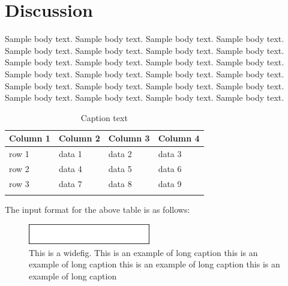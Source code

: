 \documentclass[default,iicol,lineno]{sn-jnl}%
\begin{document}
\section{Discussion}\label{sec4_results}

Sample body text. Sample body text. Sample body text. Sample body text. Sample body text. Sample body text. Sample body text. Sample body text. Sample body text. Sample body text. Sample body text. Sample body text. Sample body text. Sample body text. Sample body text. Sample body text. Sample body text. Sample body text. Sample body text. Sample body text. Sample body text. Sample body text. Sample body text. Sample body text.

\begin{table}[h]
\caption{Caption text}\label{tab1}%
\begin{tabular}{@{}llll@{}}
\toprule
Column 1 & Column 2  & Column 3 & Column 4\\
\midrule
row 1    & data 1   & data 2  & data 3  \\
row 2    & data 4   & data 5\footnotemark[1]  & data 6  \\
row 3    & data 7   & data 8  & data 9\footnotemark[2]  \\
\botrule
\end{tabular}
\end{table}

\noindent
The input format for the above table is as follows:

\begin{figure}[h]%
\centering
\includegraphics[width=0.475\textwidth]{fig.eps}
\caption{This is a widefig. This is an example of long caption this is an example of long caption  this is an example of long caption this is an example of long caption}\label{fig1}
\end{figure}

\end{document}
